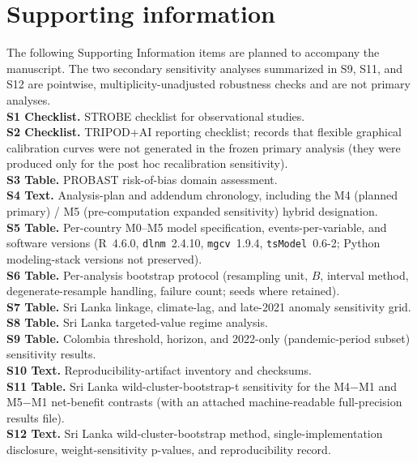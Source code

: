 \documentclass[11pt,a4paper]{article}
\begin{document}
\section*{Supporting information}
\begingroup{}
\noindent The following Supporting Information items are planned to accompany the manuscript. The two secondary sensitivity analyses summarized in S9, S11, and S12 are pointwise, multiplicity-unadjusted robustness checks and are not primary analyses.\\[0.4em]
\noindent\textbf{S1 Checklist.} STROBE checklist for observational studies.\\
\textbf{S2 Checklist.} TRIPOD+AI reporting checklist; records that flexible graphical calibration curves were not generated in the frozen primary analysis (they were produced only for the post hoc recalibration sensitivity).\\
\textbf{S3 Table.} PROBAST risk-of-bias domain assessment.\\
\textbf{S4 Text.} Analysis-plan and addendum chronology, including the M4 (planned primary) / M5 (pre-computation expanded sensitivity) hybrid designation.\\
\textbf{S5 Table.} Per-country M0--M5 model specification, events-per-variable, and software versions (R~4.6.0, \texttt{dlnm}~2.4.10, \texttt{mgcv}~1.9.4, \texttt{tsModel}~0.6-2; Python modeling-stack versions not preserved).\\
\textbf{S6 Table.} Per-analysis bootstrap protocol (resampling unit, $B$, interval method, degenerate-resample handling, failure count; seeds where retained).\\
\textbf{S7 Table.} Sri Lanka linkage, climate-lag, and late-2021 anomaly sensitivity grid.\\
\textbf{S8 Table.} Sri Lanka targeted-value regime analysis.\\
\textbf{S9 Table.} Colombia threshold, horizon, and 2022-only (pandemic-period subset) sensitivity results.\\
\textbf{S10 Text.} Reproducibility-artifact inventory and checksums.\\
\textbf{S11 Table.} Sri Lanka wild-cluster-bootstrap-t sensitivity for the M4$-$M1 and M5$-$M1 net-benefit contrasts (with an attached machine-readable full-precision results file).\\
\textbf{S12 Text.} Sri Lanka wild-cluster-bootstrap method, single-implementation disclosure, weight-sensitivity p-values, and reproducibility record.
\endgroup
\end{document}
